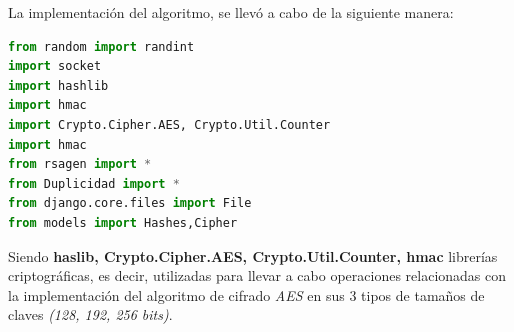La implementación del algoritmo, se llevó a cabo de la siguiente manera: 

\begin{lstlisting}[language=Python,frame=single, keywordstyle=\color{blue},showstringspaces=false]
from random import randint
import socket
import hashlib
import hmac
import Crypto.Cipher.AES, Crypto.Util.Counter
import hmac
from rsagen import *
from Duplicidad import *
from django.core.files import File
from models import Hashes,Cipher
\end{lstlisting}

Siendo \textbf{haslib, Crypto.Cipher.AES, Crypto.Util.Counter, hmac} librerías criptográficas, es decir, utilizadas para llevar a cabo operaciones relacionadas con la implementación del algoritmo de cifrado \textit{AES} en sus 3 tipos de tamaños de claves \textit{(128, 192, 256 bits)}.\\ \\ 

